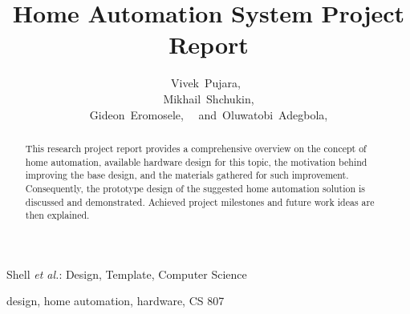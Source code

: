 \documentclass[journal,onecolumn]{IEEEtran}
\begin{document}

\title{Home Automation System Project Report }

\author{Vivek~Pujara,~
\\~Mikhail~Shchukin,~
\\~Gideon~Eromosele,~
~and~Oluwatobi~Adegbola,~
}


%
{Shell \MakeLowercase{\textit{et al.}}: Design, Template, Computer Science }


\maketitle

\begin{abstract}
This research project report provides a comprehensive overview on the concept of home automation, available hardware design for this topic, the motivation behind improving the base design, and the materials gathered for such improvement.
Consequently, the prototype design of the suggested home automation solution is discussed and demonstrated. Achieved project milestones and future work ideas are then explained.
\end{abstract}

\begin{IEEEkeywords}
design, home automation, hardware, CS 807
\end{IEEEkeywords}



%
\IEEEpeerreviewmaketitle
\end{document}
